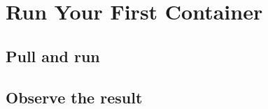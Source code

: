 \chapter{Run Your First Container}
\label{chap:first-container}

\section{Pull and run}

\section{Observe the result}

